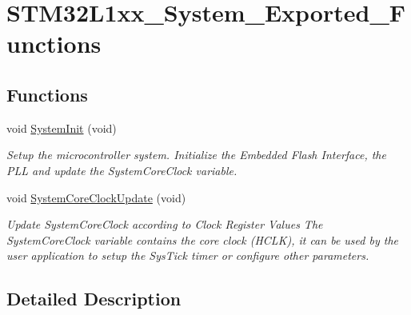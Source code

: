 \hypertarget{group___s_t_m32_l1xx___system___exported___functions}{\section{S\-T\-M32\-L1xx\-\_\-\-System\-\_\-\-Exported\-\_\-\-Functions}
\label{group___s_t_m32_l1xx___system___exported___functions}
}
\subsection*{Functions}
\begin{DoxyCompactItemize}
\item 
void \hyperlink{group___s_t_m32_l1xx___system___exported___functions_ga93f514700ccf00d08dbdcff7f1224eb2}{System\-Init} (void)
\begin{DoxyCompactList}\small\item\em Setup the microcontroller system. Initialize the Embedded Flash Interface, the P\-L\-L and update the System\-Core\-Clock variable. \end{DoxyCompactList}\item 
void \hyperlink{group___s_t_m32_l1xx___system___exported___functions_gae0c36a9591fe6e9c45ecb21a794f0f0f}{System\-Core\-Clock\-Update} (void)
\begin{DoxyCompactList}\small\item\em Update System\-Core\-Clock according to Clock Register Values The System\-Core\-Clock variable contains the core clock (H\-C\-L\-K), it can be used by the user application to setup the Sys\-Tick timer or configure other parameters. \end{DoxyCompactList}\end{DoxyCompactItemize}


\subsection{Detailed Description}


